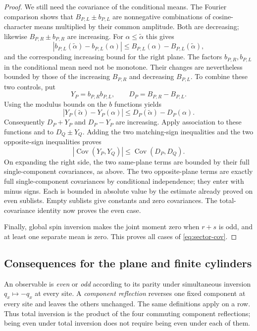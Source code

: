 \begin{proof}
We still need the covariance of the conditional means.
The Fourier comparison shows that $B_{P,L}\pm b_{P,L}$ are
nonnegative combinations of cosine-character means multiplied
by their common amplitude. Both are decreasing; likewise
$B_{P,R}\pm b_{P,R}$ are increasing. For
$\alpha\le\widetilde\alpha$ this gives
\[
 |b_{P,L}(\widetilde\alpha)-b_{P,L}(\alpha)|
 \le B_{P,L}(\alpha)-B_{P,L}(\widetilde\alpha),
\]
and the corresponding increasing bound for the right plane.
The factors $b_{P,R},b_{P,L}$ in the conditional mean need not be monotone.
Their changes are nevertheless
bounded by those of the increasing $B_{P,R}$ and decreasing $B_{P,L}$.
To combine these two controls, put
\[
 Y_P=b_{P,R}b_{P,L},\qquad D_P=B_{P,R}-B_{P,L}.
\]
Using the modulus bounds on the $b$ functions yields
\[
 |Y_P(\widetilde\alpha)-Y_P(\alpha)|
 \le D_P(\widetilde\alpha)-D_P(\alpha).
\]
Consequently $D_P+Y_P$ and $D_P-Y_P$ are increasing.
Apply association to these functions and to $D_Q\pm Y_Q$.
Adding the two matching-sign inequalities and the two
opposite-sign inequalities proves
\begin{equation}
 |\operatorname{Cov}(Y_P,Y_Q)|
 \le\operatorname{Cov}(D_P,D_Q).
 \label{eq:wilson-conditional-means}
\end{equation}
On expanding the right side, the two same-plane terms are
bounded by their full single-component covariances, as above.
The two opposite-plane terms are exactly full single-component
covariances by conditional independence; they enter with minus
signs. Each is bounded in absolute value by the estimate already
proved on even sublists. Empty sublists give constants and zero
covariances. The total-covariance identity now proves the even case.

Finally, global spin inversion makes the joint moment zero
when $r+s$ is odd, and at least one separate mean is zero.
This proves all cases of \eqref{eq:sector-cov}.
\end{proof}

\subsection{Consequences for the plane and finite cylinders}

An observable is \emph{even} or \emph{odd} according to its parity
under simultaneous inversion $q_x\mapsto-q_x$ at every site.
A \emph{component reflection} reverses one fixed component at
every site and leaves the others unchanged. The same definitions
apply on a row. Thus total inversion is the product of the four
commuting component reflections; being even under total inversion
does not require being even under each of them.


